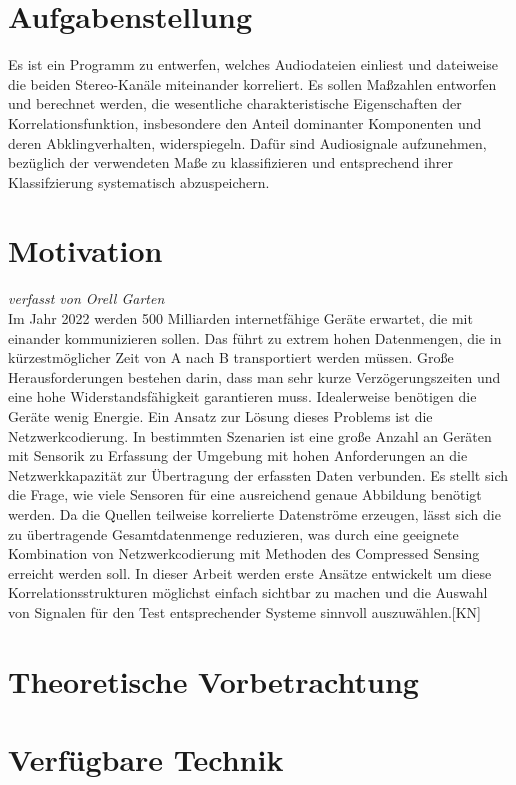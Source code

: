 \section{Aufgabenstellung}
Es ist ein Programm zu entwerfen, welches Audiodateien einliest und dateiweise die beiden Stereo-Kanäle miteinander korreliert. Es sollen Maßzahlen entworfen und berechnet werden, die wesentliche charakteristische Eigenschaften der Korrelationsfunktion, insbesondere den Anteil dominanter Komponenten und deren Abklingverhalten, widerspiegeln. Dafür sind Audiosignale aufzunehmen, bezüglich der verwendeten Maße zu klassifizieren und entsprechend ihrer Klassifzierung systematisch abzuspeichern.
\section{Motivation}
\small\textit{verfasst von Orell Garten\\}
\normalsize
Im Jahr 2022 werden 500 Milliarden internetfähige Geräte erwartet, die mit einander kommunizieren sollen. Das führt zu extrem hohen Datenmengen, die in kürzestmöglicher Zeit von A nach B transportiert werden müssen. Große Herausforderungen bestehen darin, dass man sehr kurze Verzögerungszeiten und eine hohe Widerstandsfähigkeit garantieren muss. Idealerweise benötigen die Geräte wenig Energie. Ein Ansatz zur Lösung dieses Problems ist die Netzwerkcodierung.\newline
In bestimmten Szenarien ist eine große Anzahl an Geräten mit Sensorik zu Erfassung der Umgebung mit hohen Anforderungen an die Netzwerkkapazität zur Übertragung der erfassten Daten verbunden. Es stellt sich die Frage, wie viele Sensoren für eine ausreichend genaue Abbildung benötigt werden. Da die Quellen teilweise korrelierte Datenströme erzeugen, lässt sich die zu übertragende Gesamtdatenmenge reduzieren, was durch eine geeignete Kombination von Netzwerkcodierung mit Methoden des Compressed Sensing erreicht werden soll. In dieser Arbeit werden erste Ansätze entwickelt um diese Korrelationsstrukturen möglichst einfach sichtbar zu machen und die Auswahl von Signalen für den Test entsprechender Systeme sinnvoll auszuwählen.[KN]
\newpage
\section{Theoretische Vorbetrachtung}


\newpage
\section{Verfügbare Technik}

\newpage
